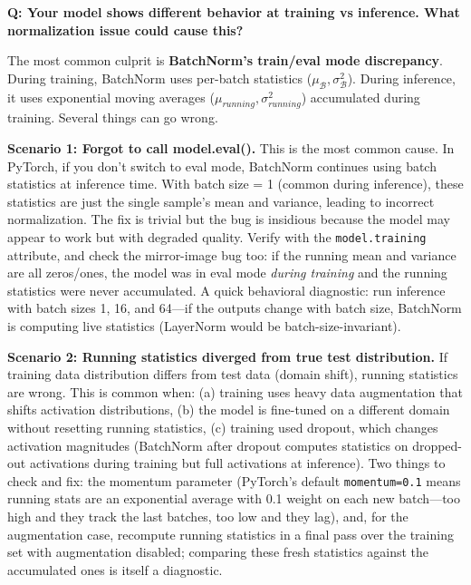 \begin{interviewq}
\textbf{Q: Your model shows different behavior at training vs inference. What normalization issue could cause this?}

 \quad {} \quad \badgefreq{\freqmed}

\stronganswer

The most common culprit is \textbf{BatchNorm's train/eval mode discrepancy}. During training, BatchNorm uses per-batch statistics ($\mu_\mathcal{B}, \sigma^2_\mathcal{B}$). During inference, it uses exponential moving averages ($\mu_{running}, \sigma^2_{running}$) accumulated during training. Several things can go wrong.

\textbf{Scenario 1: Forgot to call model.eval().} This is the most common cause. In PyTorch, if you don't switch to eval mode, BatchNorm continues using batch statistics at inference time. With batch size = 1 (common during inference), these statistics are just the single sample's mean and variance, leading to incorrect normalization. The fix is trivial but the bug is insidious because the model may appear to work but with degraded quality. Verify with the \texttt{model.training} attribute, and check the mirror-image bug too: if the running mean and variance are all zeros/ones, the model was in eval mode \textit{during training} and the running statistics were never accumulated. A quick behavioral diagnostic: run inference with batch sizes 1, 16, and 64---if the outputs change with batch size, BatchNorm is computing live statistics (LayerNorm would be batch-size-invariant).

\textbf{Scenario 2: Running statistics diverged from true test distribution.} If training data distribution differs from test data (domain shift), running statistics are wrong. This is common when: (a) training uses heavy data augmentation that shifts activation distributions, (b) the model is fine-tuned on a different domain without resetting running statistics, (c) training used dropout, which changes activation magnitudes (BatchNorm after dropout computes statistics on dropped-out activations during training but full activations at inference). Two things to check and fix: the momentum parameter (PyTorch's default \texttt{momentum=0.1} means running stats are an exponential average with 0.1 weight on each new batch---too high and they track the last batches, too low and they lag), and, for the augmentation case, recompute running statistics in a final pass over the training set with augmentation disabled; comparing these fresh statistics against the accumulated ones is itself a diagnostic.


\end{interviewq}
